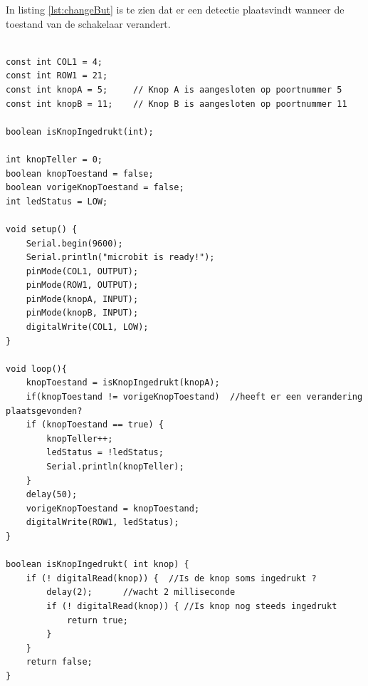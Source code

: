 In listing \ref{lst:changeBut} is te zien dat er een detectie plaatsvindt wanneer de toestand van de schakelaar verandert.
\begin{lstlisting}[caption= Een toestandverandering van de schakelaar.,label={lst:changeBut}]

const int COL1 = 4; 
const int ROW1 = 21;
const int knopA = 5;     // Knop A is aangesloten op poortnummer 5
const int knopB = 11;    // Knop B is aangesloten op poortnummer 11

boolean isKnopIngedrukt(int);

int knopTeller = 0;  
boolean knopToestand = false;
boolean vorigeKnopToestand = false;
int ledStatus = LOW;

void setup() {  
	Serial.begin(9600);
	Serial.println("microbit is ready!");
	pinMode(COL1, OUTPUT);
	pinMode(ROW1, OUTPUT);
	pinMode(knopA, INPUT);  
	pinMode(knopB, INPUT);   
    digitalWrite(COL1, LOW);
}

void loop(){
	knopToestand = isKnopIngedrukt(knopA);
	if(knopToestand != vorigeKnopToestand)  //heeft er een verandering plaatsgevonden?
	if (knopToestand == true) {
		knopTeller++;
		ledStatus = !ledStatus;
		Serial.println(knopTeller);
	}
	delay(50);
	vorigeKnopToestand = knopToestand;
	digitalWrite(ROW1, ledStatus);
}

boolean isKnopIngedrukt( int knop) {
	if (! digitalRead(knop)) {  //Is de knop soms ingedrukt ?
		delay(2);      //wacht 2 milliseconde 
		if (! digitalRead(knop)) { //Is knop nog steeds ingedrukt
			return true;
		}
	}
	return false;
}

\end{lstlisting}

